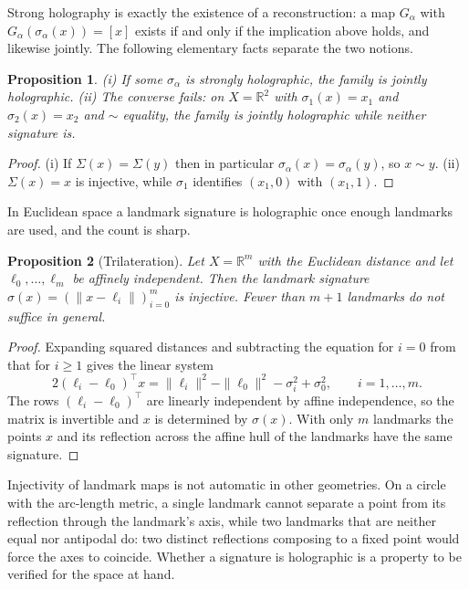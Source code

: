 \documentclass[11pt]{article}
\newtheorem{proposition}{Proposition}
\theoremstyle{remark}
\newcommand{\R}{\mathbb{R}}
\begin{document}
Strong holography is exactly the existence of a reconstruction: a map $G_\alpha$ with $G_\alpha(\sigma_\alpha(x))=[x]$ exists if and only if the implication above holds, and likewise jointly. The following elementary facts separate the two notions.

\begin{proposition}\label{prop:hfacts}
(i) If some $\sigma_\alpha$ is strongly holographic, the family is jointly holographic. (ii) The converse fails: on $X=\R^2$ with $\sigma_1(x)=x_1$ and $\sigma_2(x)=x_2$ and $\sim$ equality, the family is jointly holographic while neither signature is.
\end{proposition}

\begin{proof}
(i) If $\Sigma(x)=\Sigma(y)$ then in particular $\sigma_\alpha(x)=\sigma_\alpha(y)$, so $x\sim y$. (ii) $\Sigma(x)=x$ is injective, while $\sigma_1$ identifies $(x_1,0)$ with $(x_1,1)$.
\end{proof}

In Euclidean space a landmark signature is holographic once enough landmarks are used, and the count is sharp.

\begin{proposition}[Trilateration]\label{prop:tri}
Let $X=\R^m$ with the Euclidean distance and let $\ell_0,\dots,\ell_m$ be affinely independent. Then the landmark signature $\sigma(x)=(\|x-\ell_i\|)_{i=0}^m$ is injective. Fewer than $m+1$ landmarks do not suffice in general.
\end{proposition}

\begin{proof}
Expanding squared distances and subtracting the equation for $i=0$ from that for $i\ge1$ gives the linear system
\[
2(\ell_i-\ell_0)^{\top}x=\|\ell_i\|^2-\|\ell_0\|^2-\sigma_i^2+\sigma_0^2,\qquad i=1,\dots,m.
\]
The rows $(\ell_i-\ell_0)^{\top}$ are linearly independent by affine independence, so the matrix is invertible and $x$ is determined by $\sigma(x)$. With only $m$ landmarks the points $x$ and its reflection across the affine hull of the landmarks have the same signature.
\end{proof}

Injectivity of landmark maps is not automatic in other geometries. On a circle with the arc-length metric, a single landmark cannot separate a point from its reflection through the landmark's axis, while two landmarks that are neither equal nor antipodal do: two distinct reflections composing to a fixed point would force the axes to coincide. Whether a signature is holographic is a property to be verified for the space at hand.
\end{document}
